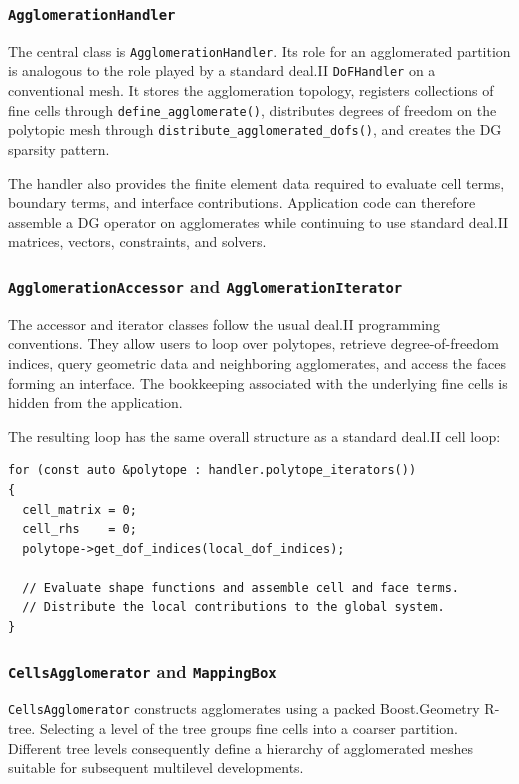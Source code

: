 \documentclass[a4paper,12pt]{article}
\begin{document}
\subsubsection{\texttt{AgglomerationHandler}}

The central class is \texttt{AgglomerationHandler}. Its role for an
agglomerated partition is analogous to the role played by a standard deal.II
\texttt{DoFHandler} on a conventional mesh. It stores the agglomeration
topology, registers collections of fine cells through
\texttt{define\_agglomerate()}, distributes degrees of freedom on the
polytopic mesh through \texttt{distribute\_agglomerated\_dofs()}, and creates
the DG sparsity pattern.

The handler also provides the finite element data required to evaluate cell
terms, boundary terms, and interface contributions. Application code can
therefore assemble a DG operator on agglomerates while continuing to use
standard deal.II matrices, vectors, constraints, and solvers.

\subsubsection{\texttt{AgglomerationAccessor} and
\texttt{AgglomerationIterator}}

The accessor and iterator classes follow the usual deal.II programming
conventions. They allow users to loop over polytopes, retrieve degree-of-freedom indices, query geometric data and neighboring agglomerates, and
access the faces forming an interface. The bookkeeping associated with the
underlying fine cells is hidden from the application.

The resulting loop has the same overall structure as a standard deal.II cell
loop:
\begin{lstlisting}[caption=Iteration over agglomerated elements]
for (const auto &polytope : handler.polytope_iterators())
{
  cell_matrix = 0;
  cell_rhs    = 0;
  polytope->get_dof_indices(local_dof_indices);

  // Evaluate shape functions and assemble cell and face terms.
  // Distribute the local contributions to the global system.
}
\end{lstlisting}

\subsubsection{\texttt{CellsAgglomerator} and \texttt{MappingBox}}

\texttt{CellsAgglomerator} constructs agglomerates using a packed
Boost.Geometry R-tree. Selecting a level of the tree groups fine cells into a
coarser partition. Different tree levels consequently define a hierarchy of
agglomerated meshes suitable for subsequent multilevel developments.
\end{document}
